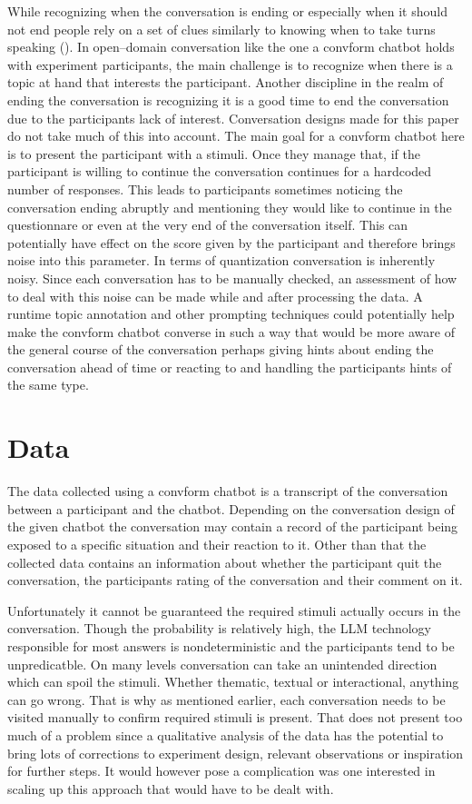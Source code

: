 \documentclass[12pt]{report}
\begin{document}
{While recognizing when the conversation is ending
or especially when it should not end
people rely on a set of clues
similarly to knowing when to take turns speaking ().
In open–domain conversation
like the one a convform chatbot holds with experiment participants,
the main challenge is to recognize
when there is a topic at hand
that interests the participant.
Another discipline in the realm of ending the conversation
is recognizing it is a good time to end the conversation
due to the participants lack of interest.
Conversation designs made for this paper
do not take much of this into account.
The main goal for a convform chatbot here
is to present the participant with a stimuli.
Once they manage that,
if the participant is willing to continue
the conversation continues for a hardcoded number of responses.
This leads to participants sometimes noticing
the conversation ending abruptly
and mentioning they would like to continue
in the questionnare
or even at the very end of the conversation itself.
This can potentially have effect on
the score given by the participant
and therefore brings noise into this parameter.
In terms of quantization
conversation is inherently noisy.
Since each conversation has to be manually checked,
an assessment of how to deal with this noise can be made
while and after processing the data.
A runtime topic annotation
and other prompting techniques
could potentially help make
the convform chatbot converse in such a way
that would be more aware of the general course of the conversation
perhaps giving hints about ending the conversation ahead of time
or reacting to and handling the participants hints of the same type.

\section{Data}

The data collected using a convform chatbot
is a transcript of the conversation
between a participant and the chatbot.
Depending on the conversation design of the given chatbot
the conversation may contain a record of
the participant being exposed to a specific situation
and their reaction to it.
Other than that the collected data contains
an information about whether the participant quit the conversation,
the participants rating of the conversation
and their comment on it.

Unfortunately it cannot be guaranteed
the required stimuli actually occurs in the conversation.
Though the probability is relatively high,
the LLM technology responsible for most answers
is nondeterministic
and the participants tend to be unpredicatble.
On many levels conversation can take an unintended direction
which can spoil the stimuli.
Whether thematic, textual or interactional,
anything can go wrong.
That is why as mentioned earlier,
each conversation needs to be visited manually
to confirm required stimuli is present.
That does not present too much of a problem
since a qualitative analysis of the data
has the potential to bring lots of
corrections to experiment design,
relevant observations or
inspiration for further steps.
It would however pose a complication
was one interested in scaling up this approach
that would have to be dealt with.

}
\end{document}
